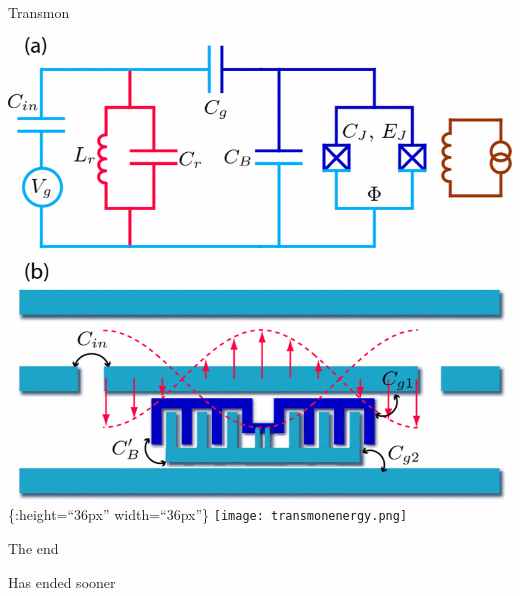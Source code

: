 \begin{frame}{Transmon}
\protect\hypertarget{transmon}{}

\includegraphics{Avance1/transmon.png}\{:height=“36px” width=“36px”\}
\texttt{[image: transmonenergy.png]}

\end{frame}

\begin{frame}{The end}
\protect\hypertarget{the-end}{}

Has ended sooner

\end{frame}
